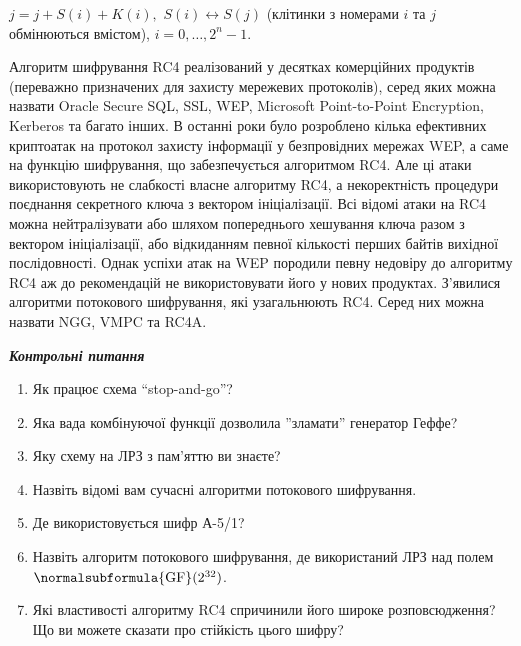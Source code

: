  $j=j+S(i)+K(i),$   $S(i)\leftrightarrow S(j)$ (клітинки з номерами  $i$
та  $j$ обмінюються вмістом),  $i=0,\dots,2^n-1$.

Алгоритм шифрування RC4 реалізований у  десятках комерційних продуктів
(переважно призначених для захисту мережевих протоколів), серед яких можна
назвати Oracle Secure SQL, SSL, WEP, Microsoft Point{}-to{}-Point Encryption,
Kerberos та багато інших. В останні роки було розроблено кілька ефективних
криптоатак на протокол захисту інформації у безпровідних мережах WEP, а саме на
функцію шифрування, що забезпечується алгоритмом RC4. Але ці атаки
використовують не слабкості власне  алгоритму RC4, а  некоректність процедури
поєднання секретного ключа з вектором  ініціалізації. Всі відомі атаки на RC4
можна нейтралізувати або шляхом попереднього хешування ключа разом з вектором
ініціалізації, або відкиданням певної кількості перших байтів вихідної
послідовності. Однак успіхи атак на  WEP породили певну недовіру до алгоритму
RC4 аж до рекомендацій не використовувати його у нових продуктах. З’явилися
алгоритми потокового шифрування, які узагальнюють  RC4. Серед них можна назвати
NGG, VMPC та RC4A.  


\bigskip


\bigskip


\bigskip


\bigskip

{\centering\bfseries\itshape
Контрольні питання
\par}


\bigskip


\bigskip

\liststyleWWviiiNumxxiv
\begin{enumerate}
\item Як працює схема “stop{}-and{}-go”?
\item Яка вада комбінуючої функції дозволила ”зламати” генератор Геффе?
\item Яку схему на ЛРЗ з пам’яттю ви знаєте?
\item Назвіть відомі вам сучасні алгоритми потокового шифрування.
\item Де використовується шифр А-5/1?
\item Назвіть алгоритм потокового шифрування, де використаний ЛРЗ над полем 
$\normalsubformula{\text{GF}}(2^{\text32})$.
\item Які властивості алгоритму RC4 спричинили його широке розповсюдження? Що ви
можете сказати про стійкість цього шифру?
\end{enumerate}

